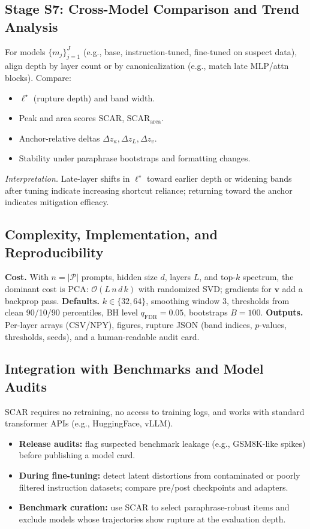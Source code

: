 \documentclass[11pt]{article}
\begin{document}
\subsection{Stage S7: Cross-Model Comparison and Trend Analysis}
\label{subsec:scar-compare}
For models $\{m_j\}_{j=1}^J$ (e.g., base, instruction-tuned, fine-tuned on suspect data), align depth by layer count or by canonicalization (e.g., match late MLP/attn blocks). Compare:
\begin{itemize}\setlength\itemsep{2pt}
\item $\ell^\star$ (rupture depth) and band width.
\item Peak and area scores $\mathrm{SCAR}$, $\mathrm{SCAR}_{\text{area}}$.
\item Anchor-relative deltas $\Delta z_\kappa,\Delta z_L,\Delta z_v$.
\item Stability under paraphrase bootstraps and formatting changes.
\end{itemize}
\emph{Interpretation.} Late-layer shifts in $\ell^\star$ toward earlier depth or widening bands after tuning indicate increasing shortcut reliance; returning toward the anchor indicates mitigation efficacy.

\subsection{Complexity, Implementation, and Reproducibility}
\textbf{Cost.} With $n=|\mathcal{P}|$ prompts, hidden size $d$, layers $L$, and top-$k$ spectrum, the dominant cost is PCA: $\mathcal{O}(L\,n\,d\,k)$ with randomized SVD; gradients for $\mathbf{v}$ add a backprop pass.  
\textbf{Defaults.} $k\!\in\!\{32,64\}$, smoothing window $3$, thresholds from clean 90/10/90 percentiles, BH level $q_{\mathrm{FDR}}=0.05$, bootstraps $B=100$.  
\textbf{Outputs.} Per-layer arrays (CSV/NPY), figures, rupture JSON (band indices, $p$-values, thresholds, seeds), and a human-readable audit card.

\subsection{Integration with Benchmarks and Model Audits}
\label{subsec:scar-integration}
SCAR requires no retraining, no access to training logs, and works with standard transformer APIs (e.g., HuggingFace, vLLM).

\begin{itemize}\setlength\itemsep{2pt}
\item \textbf{Release audits:} flag suspected benchmark leakage (e.g., GSM8K-like spikes) before publishing a model card.
\item \textbf{During fine-tuning:} detect latent distortions from contaminated or poorly filtered instruction datasets; compare pre/post checkpoints and adapters.
\item \textbf{Benchmark curation:} use SCAR to select paraphrase-robust items and exclude models whose trajectories show rupture at the evaluation depth.
\end{itemize}
\end{document}
